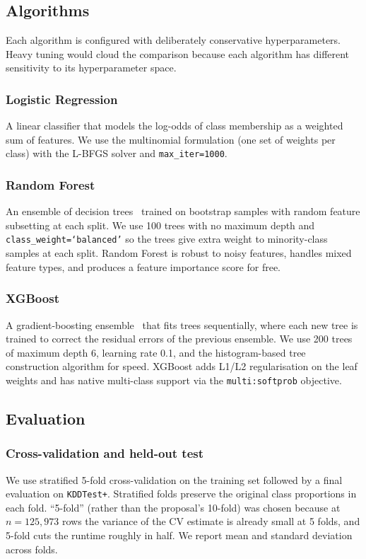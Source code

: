 \documentclass[11pt, a4paper]{article}
\begin{document}
\subsection{Algorithms}
Each algorithm is configured with deliberately conservative hyperparameters. Heavy tuning would cloud the comparison because each algorithm has different sensitivity to its hyperparameter space.

\subsubsection{Logistic Regression}
A linear classifier that models the log-odds of class membership as a weighted sum of features. We use the multinomial formulation (one set of weights per class) with the L-BFGS solver and \texttt{max\_iter=1000}.

\subsubsection{Random Forest}
An ensemble of decision trees~\cite{breiman2001} trained on bootstrap samples with random feature subsetting at each split. We use 100 trees with no maximum depth and \texttt{class\_weight=`balanced'} so the trees give extra weight to minority-class samples at each split. Random Forest is robust to noisy features, handles mixed feature types, and produces a feature importance score for free.

\subsubsection{XGBoost}
A gradient-boosting ensemble~\cite{chen2016} that fits trees sequentially, where each new tree is trained to correct the residual errors of the previous ensemble. We use 200 trees of maximum depth 6, learning rate 0.1, and the histogram-based tree construction algorithm for speed. XGBoost adds L1/L2 regularisation on the leaf weights and has native multi-class support via the \texttt{multi:softprob} objective.

\subsection{Evaluation}

\subsubsection{Cross-validation and held-out test}
We use stratified 5-fold cross-validation on the training set followed by a final evaluation on \texttt{KDDTest+}. Stratified folds preserve the original class proportions in each fold. ``5-fold'' (rather than the proposal's 10-fold) was chosen because at $n=125{,}973$ rows the variance of the CV estimate is already small at 5 folds, and 5-fold cuts the runtime roughly in half. We report mean and standard deviation across folds.
\end{document}
